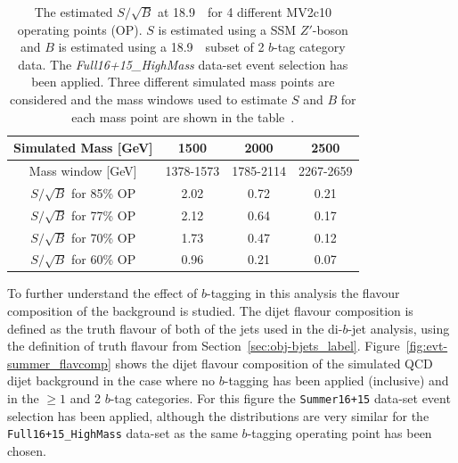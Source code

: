 \begin{table}[ht]
\begin{center}
\begin{tabular}{|c||c|c|c|}
  \hline
  Simulated Mass [GeV]        &  1500  &   2000  &  2500  \\
  \hline
  Mass window [GeV]               & 1378-1573       &  1785-2114   &  2267-2659 \\
  \hline
  $S/\sqrt{B}$ for 85\% OP        &  2.02           &  0.72        &  0.21          \\
  $S/\sqrt{B}$ for 77\% OP        &  2.12           &  0.64        &  0.17          \\
  $S/\sqrt{B}$ for 70\% OP        &  1.73           &  0.47        &  0.12          \\
  $S/\sqrt{B}$ for 60\% OP        &  0.96           &  0.21        &  0.07          \\ \hline
\end{tabular}
\caption[The estimated $S/\sqrt{B}$ at 18.9~\ifb~for 4 different MV2c10 operating points (OP).
  $S$ is estimated using a SSM $Z'$-boson and $B$ is estimated using a 18.9~\ifb~subset of 2 $b$-tag category data.
  The \textit{Full16+15\_HighMass} data-set event selection has been applied.
  Three different simulated mass points are considered and the mass windows used
  to estimate $S$ and $B$ for each mass point are shown in the table.]
        {The estimated $S/\sqrt{B}$ at 18.9~\ifb~for 4 different MV2c10 operating points (OP).
          $S$ is estimated using a SSM $Z'$-boson and $B$ is estimated using a 18.9~\ifb~subset of 2 $b$-tag category data.
          The \textit{Full16+15\_HighMass} data-set event selection has been applied.
          Three different simulated mass points are considered and the mass windows used
          to estimate $S$ and $B$ for each mass point are shown in the table~\cite{dibjet-full_int}.}
\label{tab:evt-btag_hm}
\end{center}
\end{table}

To further understand the effect of $b$-tagging in this analysis the flavour composition of the background is studied.
The dijet flavour composition is defined as the truth flavour of both of the jets used in the di-$b$-jet analysis,
using the definition of truth flavour from Section~\ref{sec:obj-bjets_label}.
Figure~\ref{fig:evt-summer_flavcomp} shows the dijet flavour composition of the simulated QCD dijet background in
the case where no $b$-tagging has been applied (inclusive) and in the $\geq1$ and 2 $b$-tag categories.
For this figure the \verb|Summer16+15| data-set event selection has been applied,
although the distributions are very similar for the \verb|Full16+15_HighMass| data-set
as the same $b$-tagging operating point has been chosen.

